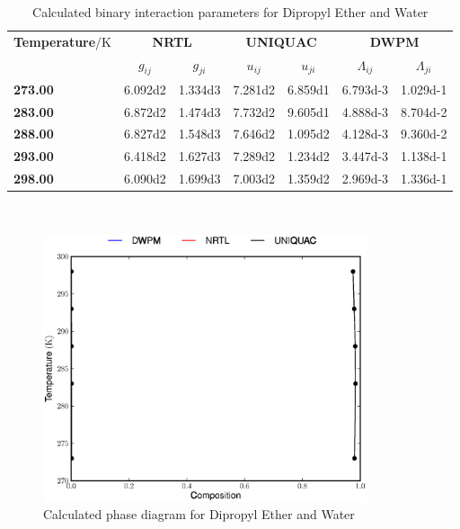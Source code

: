 \begin{landscape}
\vspace*{\fill}
\begin{table}[h]
\caption{Calculated binary interaction parameters for Dipropyl Ether and Water} 
\centering
\begin{tabular}{lcccccc}
\toprule
\textbf{Temperature}/$\mathrm{K}$&\multicolumn{2}{c}{\textbf{NRTL}}&\multicolumn{2}{c}{\textbf{UNIQUAC}}&\multicolumn{2}{c}{\textbf{DWPM}}\\
\cmidrule(r){2-7}
&$g_{ij}$&$g_{ji}$&$u_{ij}$&$u_{ji}$&$\Lambda_{ij}$&$\Lambda_{ji}$\\
\midrule
\textbf{ 273.00 } & \num{6.092d2} & \num{1.334d3} & \num{7.281d2} & \num{6.859d1} & \num{6.793d-3} & \num{1.029d-1}\\
\textbf{ 283.00 } & \num{6.872d2} & \num{1.474d3} & \num{7.732d2} & \num{9.605d1} & \num{4.888d-3} & \num{8.704d-2}\\
\textbf{ 288.00 } & \num{6.827d2} & \num{1.548d3} & \num{7.646d2} & \num{1.095d2} & \num{4.128d-3} & \num{9.360d-2}\\
\textbf{ 293.00 } & \num{6.418d2} & \num{1.627d3} & \num{7.289d2} & \num{1.234d2} & \num{3.447d-3} & \num{1.138d-1}\\
\textbf{ 298.00 } & \num{6.090d2} & \num{1.699d3} & \num{7.003d2} & \num{1.359d2} & \num{2.969d-3} & \num{1.336d-1}\\
\bottomrule
\end{tabular}\\
\label{dipropylether-waterTable}
\end{table}
\vspace*{\fill}
\end{landscape}

\begin{figure}[hp]
\centering
\includegraphics[width = 0.85\textwidth]{Results_Parts/BinaryParams/dipropylether-water/PhaseDiagram.eps}
\caption{Calculated phase diagram for Dipropyl Ether and Water} \label{dipropylether-waterFigure}
\end{figure}\

